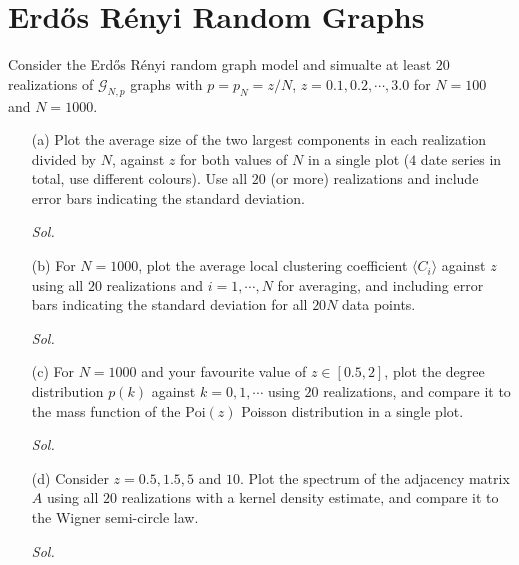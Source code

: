 \section{Erd\H{o}s R\'{e}nyi Random Graphs}

Consider the Erd\H{o}s R\'{e}nyi random graph model and simualte at least $20$ realizations of $\mathcal{G}_{N,p}$ graphs with $p = p_N = z / N$, $z = 0.1, 0.2, \cdots, 3.0$ for $N = 100$ and $N = 1000$.

\begin{enumerate}
    \item[(a)] Plot the average size of the two largest components in each realization divided by $N$, against $z$ for both values of $N$ in a single plot ($4$ date series in total, use different colours). Use all $20$ (or more) realizations and include error bars indicating the standard deviation. 
    
    \textit{ Sol. }

    \item[(b)] For $N = 1000$, plot the average local clustering coefficient $\langle C_i \rangle$ against $z$ using all $20$ realizations and $i = 1, \cdots, N$ for averaging, and including error bars indicating the standard deviation for all $20N$ data points.
    
    \textit{ Sol. }

    \item[(c)] For $N = 1000$ and your favourite value of $z \in [0.5, 2]$, plot the degree distribution $p(k)$ against $k = 0, 1, \cdots$ using $20$ realizations, and compare it to the mass function of the $\text{Poi}(z)$ Poisson distribution in a single plot. 
    
    \textit{ Sol. }

    \item[(d)] Consider $z = 0.5, 1.5, 5$ and $10$. Plot the spectrum of the adjacency matrix $A$ using all $20$ realizations with a kernel density estimate, and compare it to the Wigner semi-circle law. 
    
    \textit{ Sol. }
\end{enumerate}